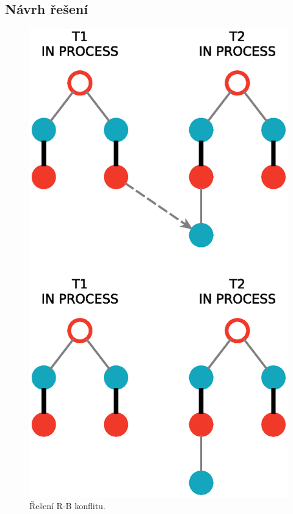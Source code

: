 \documentclass[a4paper, 11pt, titlepage, final]{article}[3. prosinec 2011]
\begin{document}
\subsection{Návrh řešení}

\begin{figure}[ht]
  \centering
  \includegraphics[scale=0.5]{img/inconflict.eps}
  \caption{Řešení R-B konflitu.}
  \label{imgConflict}
\end{figure}
\end{document}
